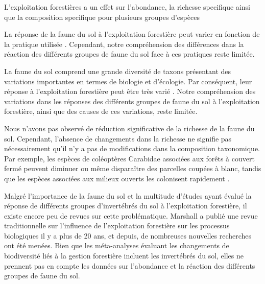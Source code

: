 L'exploitation forestières a un effet sur l'abondance, la richesse specifique ainsi que la composition specifique pour plusieurs groupes d'espèces \citep{Kudrin2023metaanalysiseffects}

La réponse de la faune du sol à l'exploitation forestière peut varier en fonction de la pratique utilisée \citep{Paillet2010Biodiversitydifferences,Fedrowitz2014Canretention,Chaudhary2016Impactforest}. 
Cependant, notre compréhension des différences dans la réaction des différents groupes de faune du sol face à ces pratiques reste limitée. 

La faune du sol comprend une grande diversité de taxons présentant des variations importantes en termes de biologie et d'écologie. 
Par conséquent, leur réponse à l'exploitation forestière peut être très varié \citep{Malmstrom2009Dynamicssoil}.
Notre compréhension des variations dans les réponses des différents groupes de faune du sol à l'exploitation forestière, ainsi que des causes de ces variations, reste limitée.

Nous n'avons pas observé de réduction significative de la richesse de la faune du sol. 
Cependant, l'absence de changements dans la richesse ne signifie pas nécessairement qu'il n'y a pas de modifications dans la composition taxonomique. 
Par exemple, les espèces de coléoptères Carabidae associées aux forêts à couvert fermé peuvent diminuer ou même disparaître des parcelles coupées à blanc, 
tandis que les espèces associées aux milieux ouverts les colonisent rapidement \citep{Niemela2007effectsforestry,Pohl2007Rovebeetles,Kudrin2023metaanalysiseffects}.



Malgré l'importance de la faune du sol et la multitude d'études ayant évalué la réponse de différents groupes d'invertébrés du sol à l'exploitation forestière, il existe encore peu de revues sur cette problématique. 
Marshall a publié une revue traditionnelle sur l'influence de l'exploitation forestière sur les processus biologiques il y a plus de 20 ans, et depuis, de nombreuses nouvelles recherches ont été menées. 
Bien que les méta-analyses évaluant les changements de biodiversité liés à la gestion forestière incluent les invertébrés du sol, elles ne prennent pas en compte les données sur l'abondance et la réaction des différents groupes de faune du sol.


